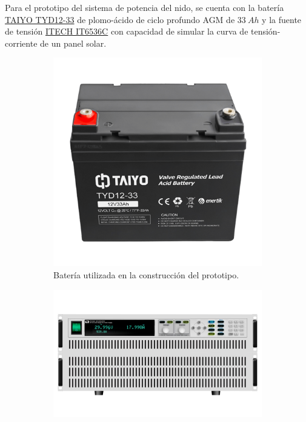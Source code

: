 \label{subsection:nido-potencia}
Para el prototipo del sistema de potencia del nido, se cuenta con la batería \href{https://enertik.ar/taiyo-tyd12-33-bateria-electrolito-absorbido-ciclo-profundo-12v-33ah}{TAIYO TYD12-33} de plomo-ácido de ciclo profundo AGM de $33 \ Ah$ y la fuente de tensión \href{https://www.itech.sh/en/product/dc-power-supply/IT6500.html}{ITECH IT6536C} con capacidad de simular la curva de tensión-corriente de un panel solar.
\begin{figure}[H]
	\centering
    	\begin{subfigure}{0.3\textwidth}
        	\centering
        	\includegraphics[width=\linewidth]{ImagenesConstruccion del prototipo/bateria_prototipo}		
			\caption{Batería utilizada en la construcción del prototipo.}
			\label{fig:bateria_prototipo}
        \end{subfigure}\hspace*{2cm}
        \begin{subfigure}{0.3\textwidth}
        	\centering
        	\includegraphics[width=\linewidth]{ImagenesConstruccion del prototipo/fuente_prototipo}

\end{subfigure}
\end{figure}
